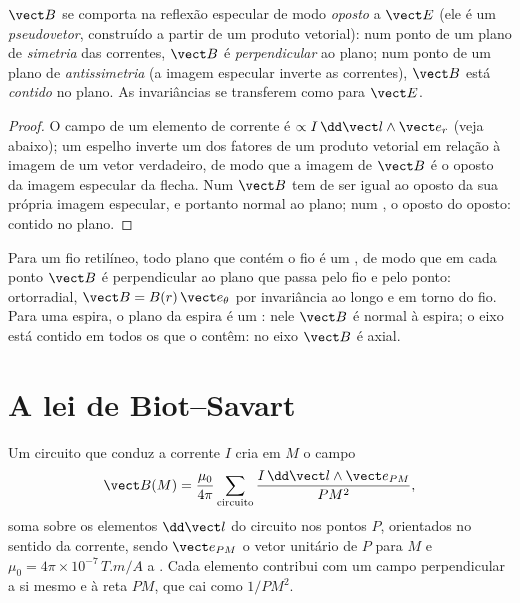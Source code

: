 \begin{proposition}\label{prop:b1:magnetostatics:symmetry}
$\vect B$ se comporta na reflexão especular de modo \emph{oposto} a $\vect E$
(ele é um \emph{pseudovetor}, construído a partir de um produto vetorial): num ponto
de um plano de \emph{simetria} das correntes, $\vect B$ é
\emph{perpendicular} ao plano; num ponto de um plano de
\emph{antissimetria} (a imagem especular inverte as correntes), $\vect B$
está \emph{contido} no plano. As invariâncias se transferem como para $\vect E$.
\end{proposition}

\begin{proof}
O campo de um elemento de corrente é $\propto I\,\dd\vect l\wedge\vect e_r$
(veja abaixo); um espelho inverte um dos fatores de um produto vetorial em relação à
imagem de um vetor verdadeiro, de modo que a imagem de $\vect B$ é o oposto da
imagem especular da flecha. Num  $\vect B$ tem de ser igual ao
oposto da sua própria imagem especular, e portanto normal ao plano; num , o oposto do oposto: contido no plano.
\end{proof}

\begin{example}\label{ex:b1:magnetostatics:symmetryuse}
Para um fio retilíneo, todo plano que contém o fio é um ,
de modo que em cada ponto $\vect B$ é perpendicular ao plano que passa pelo
fio e pelo ponto: ortorradial, $\vect B = B(r)\,\vect e_\theta$ por
invariância ao longo e em torno do fio. Para uma espira, o plano da espira
é um : nele $\vect B$ é normal à espira; o eixo
está contido em todos os  que o contêm: no eixo $\vect B$ é
axial.
\end{example}

\section{A lei de Biot--Savart}

\begin{theorem}\label{thm:b1:magnetostatics:biotsavart}
Um circuito que conduz a corrente $I$ cria em $M$ o campo
\[
\vect B(M) = \frac{\mu_0}{4\pi}\sum_{\text{circuito}} \frac{I\,\dd\vect l\wedge\vect e_{PM}}{PM^2} ,
\]
soma sobre os elementos $\dd\vect l$ do circuito nos pontos $P$,
orientados no sentido da corrente, sendo $\vect e_{PM}$ o vetor unitário de
$P$ para $M$ e $\mu_0 = 4\pi \times 10^{-7}\,\unit{T.m/A}$ a
\emph{}. Cada elemento contribui com um campo
perpendicular a si mesmo e à reta $PM$, que cai como $1/PM^2$.
\end{theorem}
\admitted

